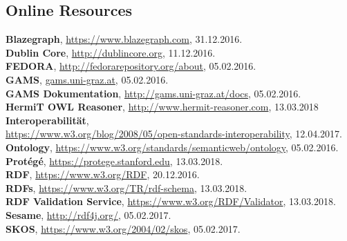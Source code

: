 \documentclass[12pt,a4paper]{article}
\begin{document}
 
\newpage


\newpage

\subsection{Online Resources}
\label{subsec:Online}

\begin{singlespace}


\textbf{Blazegraph}, \url{https://www.blazegraph.com}, 31.12.2016.
\\


\textbf{Dublin Core}, \url{http://dublincore.org}, 11.12.2016.
\\

\textbf{FEDORA}, \url{http://fedorarepository.org/about}, 05.02.2016.
\\

\textbf{GAMS}, \url{gams.uni-graz.at}, 05.02.2016.
\\

\textbf{GAMS Dokumentation}, \url{http://gams.uni-graz.at/docs}, 05.02.2016.
\\

\textbf{HermiT OWL Reasoner}, \url{http://www.hermit-reasoner.com}, 13.03.2018
\\

\textbf{Interoperabilität},\\ \url{https://www.w3.org/blog/2008/05/open-standards-interoperability}, 12.04.2017.
\\

\textbf{Ontology}, \url{https://www.w3.org/standards/semanticweb/ontology}, 05.02.2016.
\\

\textbf{Protégé}, \url{https://protege.stanford.edu}, 13.03.2018.
\\

\textbf{RDF}, \url{https://www.w3.org/RDF}, 20.12.2016.
\\

\textbf{RDFs}, \url{https://www.w3.org/TR/rdf-schema}, 13.03.2018.
\\

\textbf{RDF Validation Service}, \url{https://www.w3.org/RDF/Validator}, 13.03.2018.
\\

\textbf{Sesame}, \url{http://rdf4j.org/}, 05.02.2017.
\\

\textbf{SKOS}, \url{https://www.w3.org/2004/02/skos}, 05.02.2017. 
\\


\end{singlespace}
\end{document}
